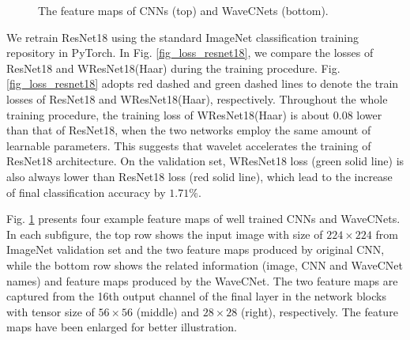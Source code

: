 \documentclass[10pt,twocolumn,letterpaper]{article}
\begin{document}
\begin{figure}[!bpt]
	\caption{The feature maps of CNNs (top) and WaveCNets (bottom).}
	\label{fig_feature_maps}
\end{figure}
We retrain ResNet18 using the standard ImageNet classification training repository in PyTorch.
In Fig. \ref{fig_loss_resnet18}, we compare the losses of ResNet18 and WResNet18(Haar) during the training procedure.
Fig. \ref{fig_loss_resnet18} adopts red dashed and green dashed lines to denote the train losses of ResNet18 and WResNet18(Haar), respectively.
Throughout the whole training procedure, the training loss of WResNet18(Haar) is about $0.08$ lower than that of ResNet18,
when the two networks employ the same amount of learnable parameters.
This suggests that wavelet accelerates the training of ResNet18 architecture.
On the validation set, WResNet18 loss (green solid line) is also always lower than ResNet18 loss (red solid line),
which lead to the increase of final classification accuracy by $1.71\%$.

Fig. \ref{fig_feature_maps} presents four example feature maps of well trained CNNs and WaveCNets.
In each subfigure, the top row shows the input image with size of $224\times224$ from ImageNet validation set
and the two feature maps produced by original CNN,
while the bottom row shows the related information (image, CNN and WaveCNet names) and feature maps produced by the WaveCNet.
The two feature maps are captured from the 16th output channel of the final layer
in the network blocks with tensor size of $56\times56$ (middle) and $28\times28$ (right), respectively.
The feature maps have been enlarged for better illustration.
\end{document}

